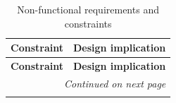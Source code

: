 \begin{longtable}{|p{}|p{}|}
	\caption{Non-functional requirements and constraints}
	\label{tab:non-functional-requirements-long}                                                                                                                                                                                                                                                                               \\
	\hline
	\textbf{Constraint} & \textbf{Design implication}                                                                                                                                                                                                                                                                          \\
	\hline
	\endfirsthead
	\hline
	\textbf{Constraint} & \textbf{Design implication}                                                                                                                                                                                                                                                                          \\
	\hline
	\endhead
	\hline
	\multicolumn{2}{|r|}{\emph{Continued on next page}}                                                                                                                                                                                                                                                                        \\
	\hline
	\endfoot
	\hline
	\endlastfoot


\end{longtable}
